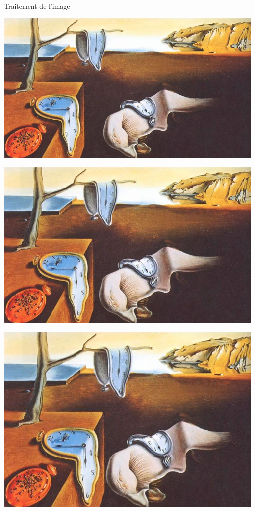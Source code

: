 \documentclass[aspectratio=169]{beamer}
\begin{document}
\begin{frame}[t, c]{Traitement de l'image}{}
  \begin{overprint}
    \vfill
    \centering
    \includegraphics[height=.75\textheight]{raw_img}
    \vfill

    \vfill
    \centering
    \includegraphics[height=.75\textheight]{cropped_img_0004}
    \vfill

    \vfill
    \centering
    \includegraphics[height=.75\textheight]{cropped_img_0003}
    \vfill


\end{overprint}
\end{frame}
\end{document}
